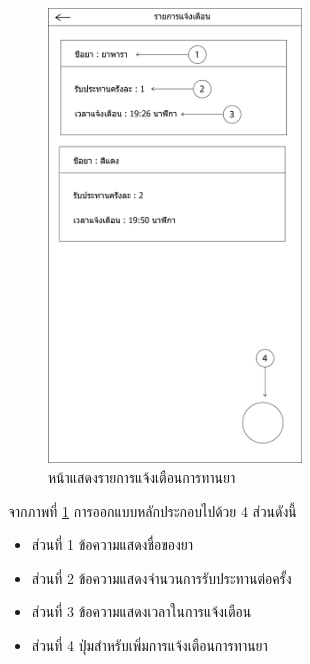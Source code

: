 		\begin{figure}[H]
			\centering
			\includegraphics[width=0.6\textwidth]{Figures/3/UI/notification}
			\caption{หน้าแสดงรายการแจ้งเตือนการทานยา}
			\label{Fig:รายการทานยา}
		\end{figure}
		จากภาพที่ \ref{Fig:รายการทานยา} การออกแบบหลักประกอบไปด้วย 4 ส่วนดังนี้
		\begin{itemize}
			\item ส่วนที่ 1 ข้อความแสดงชื่อของยา
			\item ส่วนที่ 2 ข้อความแสดงจำนวนการรับประทานต่อครั้ง
			\item ส่วนที่ 3 ข้อความแสดงเวลาในการแจ้งเตือน
			\item ส่วนที่ 4 ปุ่มสำหรับเพิ่มการแจ้งเตือนการทานยา
		\end{itemize}

